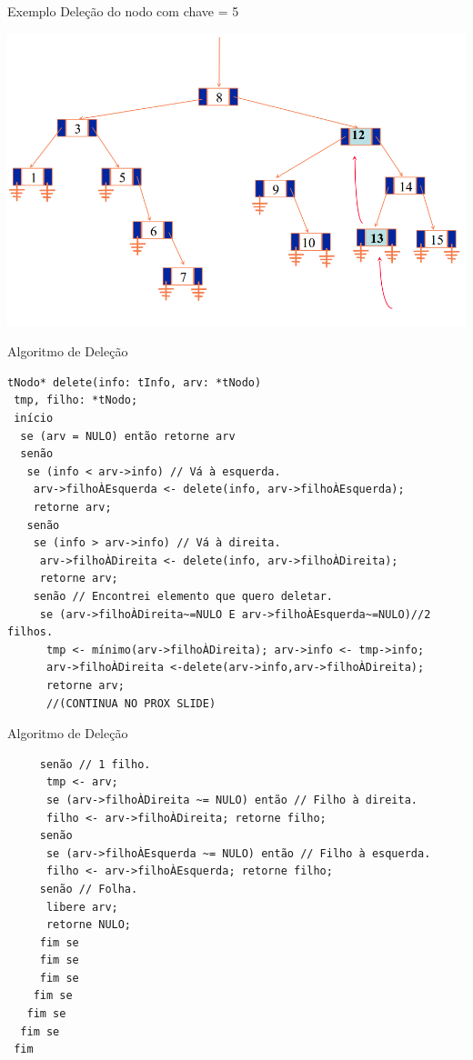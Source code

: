 \documentclass[12pt,table,xcolor={dvipsnames}]{beamer}
\begin{document}
\begin{frame}[fragile]{Exemplo}
Deleção do nodo com chave = 5
\begin{center}
\includegraphics[scale=.3]{arv15.png} 
\end{center}
\end{frame}

\begin{frame}[fragile]{Algoritmo de Deleção}
          \begin{lstlisting}
tNodo* delete(info: tInfo, arv: *tNodo)
 tmp, filho: *tNodo;
 início
  se (arv = NULO) então retorne arv
  senão
   se (info < arv->info) // Vá à esquerda.
    arv->filhoÀEsquerda <- delete(info, arv->filhoÀEsquerda);
    retorne arv;
   senão
    se (info > arv->info) // Vá à direita.
     arv->filhoÀDireita <- delete(info, arv->filhoÀDireita);
     retorne arv;
    senão // Encontrei elemento que quero deletar.
     se (arv->filhoÀDireita~=NULO E arv->filhoÀEsquerda~=NULO)//2 filhos.
      tmp <- mínimo(arv->filhoÀDireita); arv->info <- tmp->info;
      arv->filhoÀDireita <-delete(arv->info,arv->filhoÀDireita);
      retorne arv;
      //(CONTINUA NO PROX SLIDE)
		  \end{lstlisting}
\end{frame} 

\begin{frame}[fragile]{Algoritmo de Deleção}
          \begin{lstlisting}
     senão // 1 filho.
      tmp <- arv;
      se (arv->filhoÀDireita ~= NULO) então // Filho à direita.
      filho <- arv->filhoÀDireita; retorne filho;
     senão
      se (arv->filhoÀEsquerda ~= NULO) então // Filho à esquerda.
      filho <- arv->filhoÀEsquerda; retorne filho;
     senão // Folha.
      libere arv;
      retorne NULO;
     fim se 
     fim se
     fim se
    fim se 
   fim se
  fim se
 fim
		  \end{lstlisting}
\end{frame} 
\end{document}
